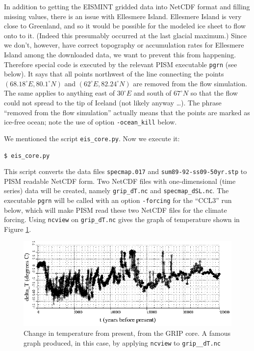 \documentclass[11pt,final]{amsart}
\newcommand{\und}{\_\!\_}
\begin{document}
In addition to getting the EISMINT gridded data into NetCDF format and filling missing values, there is an issue with Ellesmere Island.  Ellesmere Island is very close to Greenland, and so it would be possible for the modeled ice sheet to flow onto to it.  (Indeed this presumably occurred at the last glacial maximum.)  Since we don't, however, have correct topography or accumulation rates for Ellesmere Island among the downloaded data, we want to prevent this from happening.  Therefore special code is executed by the relevant PISM executable \verb|pgrn| (see below).  It says that all points northwest of the line connecting the points $(68.18^\circ E, 80.1^\circ N)$ and $(62^\circ E, 82.24^\circ N)$ are removed from the flow simulation.  The same applies to anything east of $30^\circ E$ and south of $67^\circ N$ so that the flow could not spread to the tip of Iceland (not likely anyway \dots).  The phrase ``removed from the flow simulation'' actually means that the points are marked as ice-free ocean; note the use of option \verb|-ocean_kill| below.

We mentioned the script \verb|eis_core.py|.  Now we execute it:

\verb|$ eis_core.py|

\noindent This script converts the data files \verb|specmap.017| and \verb|sum89-92-ss09-50yr.stp| to  PISM readable NetCDF form.  Two NetCDF files with one-dimensional (time series) data will be created, namely \verb|grip_dT.nc| and \verb|specmap_dSL.nc|.  The executable \verb|pgrn| will be called with an option \verb|-forcing| for the ``CCL3'' run below, which will make PISM read these two NetCDF files for the climate forcing.  Using \verb|ncview| on \verb|grip_dT.nc| gives the graph of temperature shown in Figure \ref{fig:gripDeltaT}.

\begin{figure}[ht]
\includegraphics[width=5.6in,keepaspectratio=true]{figs/gripDeltaT}
\caption{Change in temperature from present, from the GRIP core.  A famous graph produced, in this case, by applying \texttt{ncview} to \texttt{grip\und dT.nc}}
\label{fig:gripDeltaT}
\end{figure}
\end{document}
